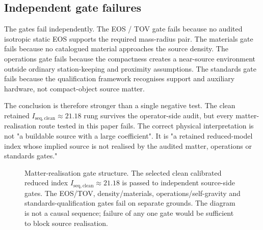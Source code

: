 \documentclass[11pt,a4paper]{article}
\begin{document}
\subsection{Independent gate failures}

The gates fail independently. The EOS / TOV gate fails because no audited isotropic static EOS supports the required mass-radius pair. The materials gate fails because no catalogued material approaches the source density. The operations gate fails because the compactness creates a near-source environment outside ordinary station-keeping and proximity assumptions. The standards gate fails because the qualification framework recognises support and auxiliary hardware, not compact-object source matter.

The conclusion is therefore stronger than a single negative test. The clean retained $I_{\mathrm{seq,clean}}\approx21.18$ rung survives the operator-side audit, but every matter-realisation route tested in this paper fails. The correct physical interpretation is not "a buildable source with a large coefficient". It is "a retained reduced-model index whose implied source is not realised by the audited matter, operations or standards gates."

\begin{figure}[t]
\centering
{}
\caption{Matter-realisation gate structure. The selected clean calibrated reduced index $I_{\mathrm{seq,clean}}\approx21.18$ is passed to independent source-side gates. The EOS/TOV, density/materials, operations/self-gravity and standards-qualification gates fail on separate grounds. The diagram is not a causal sequence; failure of any one gate would be sufficient to block source realisation.}
\label{fig:gate-chain}
\end{figure}
\end{document}

